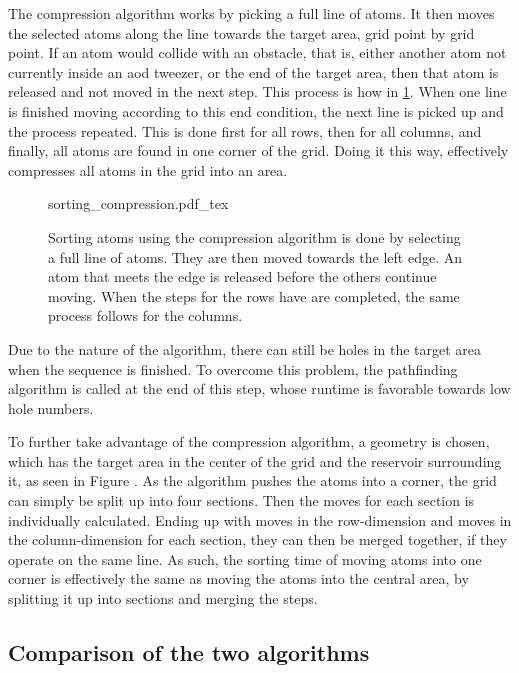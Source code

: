 The compression algorithm works by picking a full line of atoms. It then moves the selected atoms along the line towards the target area, grid point by grid point. If an atom would collide with an obstacle, that is, either another atom not currently inside an \ac{aod} tweezer, or the end of the target area, then that atom is released and not moved in the next step. This process is how in \ref{fig:sorting_compression}. When one line is finished moving according to this end condition, the next line is picked up and the process repeated. This is done first for all rows, then for all columns, and finally, all atoms are found in one corner of the grid. Doing it this way, effectively compresses all atoms in the grid into an area.

\begin{figure}[ht]
\label{fig:sorting_compression}
\centering
	{sorting_compression.pdf_tex}
	\caption{Sorting atoms using the compression algorithm is done by selecting a full line of atoms. They are then moved towards the left edge. An atom that meets the edge is released before the others continue moving. When the steps for the rows have are completed, the same process follows for the columns.}
\end{figure}

Due to the nature of the algorithm, there can still be holes in the target area when the sequence is finished. To overcome this problem, the pathfinding algorithm is called at the end of this step, whose runtime is favorable towards low hole numbers.

To further take advantage of the compression algorithm, a geometry is chosen, which has the target area in the center of the grid and the reservoir surrounding it, as seen in Figure . As the algorithm pushes the atoms into a corner, the grid can simply be split up into four sections. Then the moves for each section is individually calculated. Ending up with moves in the row-dimension and moves in the column-dimension for each section, they can then be merged together, if they operate on the same line. As such, the sorting time of moving atoms into one corner is effectively the same as moving the atoms into the central area, by splitting it up into sections and merging the steps.

\subsection{Comparison of the two algorithms}

